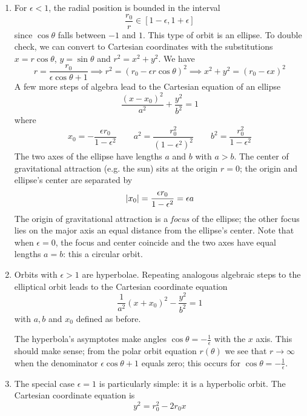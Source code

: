 \documentclass[11pt, a4paper]{article}
\begin{document}
\begin{enumerate}
	\item For $ \epsilon < 1 $, the radial position is bounded in the interval 
	\begin{equation*}
		\frac{r_{0}}{r} \in [1 - \epsilon, 1 + \epsilon]
	\end{equation*}
	since $ \cos \theta $ falls between $ -1 $ and $ 1 $. This type of orbit is an ellipse. To double check, we can convert to Cartesian coordinates with the substitutions $ x = r \cos \theta $, $ y = \sin \theta $  and $ r^{2} = x^{2} + y^{2} $. We have
	\begin{equation*}
		r = \frac{r_{0}}{\epsilon \cos \theta + 1} \implies r^{2} = (r_{0} - \epsilon r \cos \theta)^{2} \implies x^{2} + y^{2} = (r_{0} - \epsilon x)^{2}
	\end{equation*}
	A few more steps of algebra lead to the Cartesian equation of an ellipse
	\begin{equation*}
		\frac{(x - x_{0})^{2}}{a^{2}} + \frac{y^{2}}{b^{2}} = 1
	\end{equation*}
	where 
	\begin{equation*}
		x_{0} = - \frac{\epsilon r_{0}}{1 - \epsilon^{2}} \qquad a^{2} = \frac{r_{0}^{2}}{(1 - \epsilon^{2})^{2}} \qquad b^{2} = \frac{r_{0}^{2}}{1 - \epsilon^{2}}
	\end{equation*}
	The two axes of the ellipse have lengths $ a $ and $ b $ with $ a > b $. The center of gravitational attraction (e.g. the sun) sits at the origin $ r = 0 $; the origin and ellipse's center are separated by
	\begin{equation*}
		\abs{x_{0}} = \frac{\epsilon r_{0}}{1 - \epsilon^{2}} = \epsilon a
	\end{equation*}
	The origin of gravitational attraction is a \textit{focus} of the ellipse; the other focus lies on the major axis an equal distance from the ellipse's center. Note that when $ \epsilon = 0 $, the focus and center coincide and the two axes have equal lengths $ a = b $: this a circular orbit.
	
	\item Orbits with $ \epsilon > 1 $ are hyperbolae. Repeating analogous algebraic steps to the elliptical orbit leads to the Cartesian coordinate equation
	\begin{equation*}
		\frac{1}{a^{2}} (x + x_{0})^{2} - \frac{y^{2}}{b^{2}} = 1
	\end{equation*}
	with $ a, b $ and $ x_{0} $ defined as before. 
	
	The hyperbola's asymptotes make angles $ \cos \theta = -  \frac{1}{\epsilon} $ with the $ x $ axis. This should make sense; from the polar orbit equation $ r(\theta) $ we see that $ r \to \infty $ when the denominator $ \epsilon \cos \theta + 1 $ equals zero; this occurs for $ \cos \theta = -  \frac{1}{\epsilon} $.
	
	\item The special case $ \epsilon = 1 $ is particularly simple: it is a hyperbolic orbit. The Cartesian coordinate equation is
	\begin{equation*}
		y^{2} = r_{0}^{2} - 2r_{0}x
	\end{equation*} 
\end{enumerate}
\end{document}
